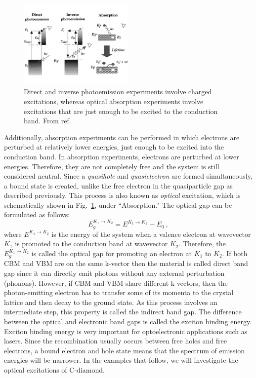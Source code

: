 \begin{figure}
	\centering
	\includegraphics[width=0.5\textwidth]{./figures/lab_excited_experiments}
	\caption{Direct and inverse photoemission experiments involve charged excitations, whereas optical absorption experiments involve excitations that are just enough to be excited to the conduction band. From ref. \cite{Onida2002a}}
	\label{fig:lab_ex_exp}
\end{figure}

Additionally, absorption experiments can be performed in which electrons are perturbed at relatively lower energies, just enough to be excited into the conduction band. 
In absorption experiments,  electrons are perturbed at lower energies. 
Therefore, they are not completely free and the system is still considered neutral. 
Since a \textit{quasihole} and \textit{quasielectron} are formed simultaneously, a bound state is created, unlike the free electron in the quasiparticle gap as described previously. 
This process is also known as \textit{optical} excitation, which is schematically shown in Fig.~\ref{fig:lab_ex_exp}, under ``Absorption." 
The optical gap can be formulated as follows:
\begin{equation}
E_g^{K_1 {\rightarrow} K_2}=E^{K_1 {\rightarrow} K_2}- E_{0}\label{eq:optical}\:,
\end{equation}
where $E^{K_1 {\rightarrow} K_2}$ is the energy of the system when a valence electron at wavevector $K_1$ is promoted to the conduction band at wavevector $K_2$. 
Therefore, the $E_g^{K_1 {\rightarrow} K_2}$ is called the optical gap for promoting an electron at $K_1$ to $K_2$.
If both CBM and VBM are on the same k-vector then the material is called direct band gap since it can directly emit photons without any external perturbation (phonons). 
However, if CBM and VBM share different k-vectors, then the photon-emitting electron has to transfer some of its momenta to the crystal lattice and then decay to the ground state. 
As this process involves an intermediate step, this property is called the indirect band gap. 
The difference between the optical and electronic band gaps is called the exciton binding energy. 
Exciton binding energy is very important for optoelectronic applications such as lasers. 
Since the recombination usually occurs between free holes and free electrons, a bound electron and hole state means that the spectrum of emission energies will be narrower. 
In the examples that follow, we will investigate the optical excitations of C-diamond.

